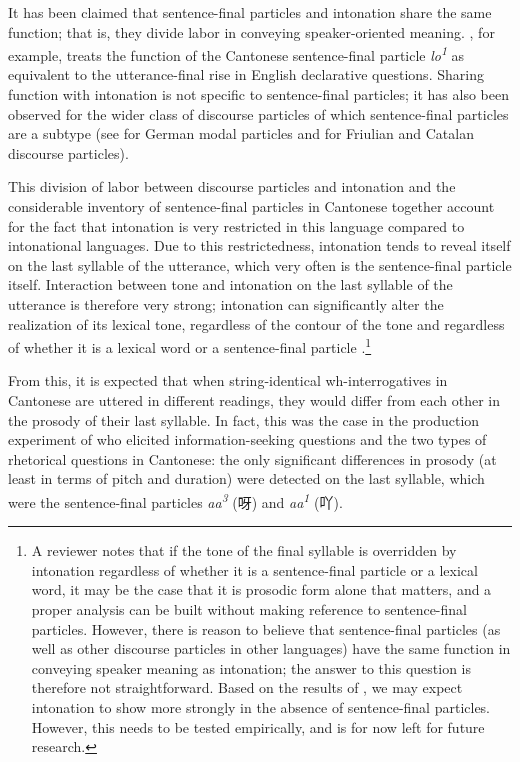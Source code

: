 \documentclass[output=paper,colorlinks,citecolor=brown            ,chinesefont]{langscibook}
\begin{document}
It has been claimed that sentence-final particles and intonation share the same function; that is, they divide labor in conveying speaker-oriented meaning. \citet{Wakefield2012}, for example, treats the function of the Cantonese sentence-final particle \textit{lo\textsuperscript{1}} as equivalent to the utterance-final rise in English declarative questions. Sharing function with intonation is not specific to sentence-final particles; it has also been observed for the wider class of discourse particles of which sentence-final particles are a subtype (see \citealt{Schubiger1965} for German modal particles and \citealt{Prieto+2021} for Friulian and Catalan discourse particles).

This division of labor between discourse particles and intonation and the considerable inventory of sentence-final particles in Cantonese together account for the fact that intonation is very restricted in this language compared to intonational languages. Due to this restrictedness, intonation tends to reveal itself on the last syllable of the utterance, which very often is the sentence-final particle itself. Interaction between tone and intonation on the last syllable of the utterance is therefore very strong; intonation can significantly alter the realization of its lexical tone, regardless of the contour of the tone and regardless of whether it is a lexical word or a sentence-final particle \citep{Lee2004, Ma+2006a, Ma+2006b, Xu+2012b, Tsui+2018, Wakefield2019}.\footnote{A reviewer notes that if the tone of the final syllable is overridden by intonation regardless of whether it is a sentence-final particle or a lexical word, it may be the case that it is prosodic form alone that matters, and a proper analysis can be built without making reference to sentence-final particles. However, there is reason to believe that sentence-final particles (as well as other discourse particles in other languages) have the same function in conveying speaker meaning as intonation; the answer to this question is therefore not straightforward. Based on the results of \citet{Prieto+2021}, we may expect intonation to show more strongly in the absence of sentence-final particles. However, this needs to be tested empirically, and is for now left for future research.}

From this, it is expected that when string-identical wh-interrogatives in Cantonese are uttered in different readings, they would differ from each other in the prosody of their last syllable. In fact, this was the case in the production experiment of \citet{Lo+2019} who elicited information-seeking questions and the two types of rhetorical questions in Cantonese: the only significant differences in prosody (at least in terms of pitch and duration) were detected on the last syllable, which were the sentence-final particles \textit{aa\textsuperscript{3}} ({\cn 呀}) and \textit{aa\textsuperscript{1}} ({\cn 吖}). 
\end{document}
